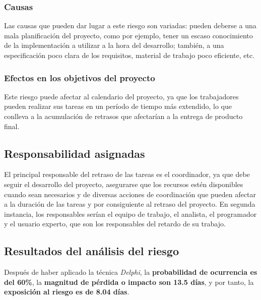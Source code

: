 \documentclass[11pt,a4paper,spanish,twoside]{book}
\begin{document}
\subsubsection{Causas}
Las causas que pueden dar lugar a este riesgo son variadas: pueden deberse a
una mala planificación del proyecto, como por ejemplo, tener un escaso
conocimiento de la implementación a utilizar a la hora del desarrollo;
también, a una especificación poco clara de los requisitos, material de
trabajo poco eficiente, etc.

\subsubsection{Efectos en los objetivos del proyecto}
Este riesgo puede afectar al calendario del proyecto, ya que los trabajadores
pueden realizar sus tareas en un período de tiempo más extendido, lo que
conlleva a la acumulación de retrasos que afectarían a la entrega
de producto final.

\subsection{Responsabilidad asignadas}
El principal responsable del retraso de las tareas es el coordinador, ya que
debe seguir el desarrollo del proyecto, asegurarse que los recursos estén
disponibles cuando sean necesarios y de diversas acciones de coordinación
que pueden afectar a la duración de las tareas y por consiguiente al retraso
del proyecto. En segunda instancia, los responsables serían el equipo de
trabajo, el analista, el programador y el usuario experto, que son los
responsables del retardo de su trabajo.

\subsection{Resultados del análisis del riesgo}
Después de haber aplicado la técnica \emph{Delphi}, la \textbf{probabilidad de
ocurrencia es del 60\%}, la \textbf{magnitud de pérdida o impacto son 13.5
días}, y por tanto, la \textbf{exposición al riesgo es de 8.04 días}.
\end{document}
